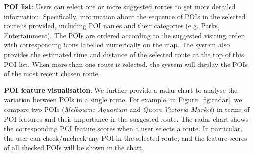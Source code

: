 
\textbf{POI list}:
Users can select one or more suggested routes to get more detailed information. 
Specifically, information about the sequence of POIs in the selected route is provided, including POI names and their categories (e.g. Parks, Entertainment).
The POIs are ordered according to the suggested visiting order, with corresponding icons labelled numerically on the map.
The system also provides the estimated time and distance of the selected route at the top of this POI list.
When more than one route is selected, the system will display the POIs of the most recent chosen route.

\textbf{POI feature visualisation}: We further provide a radar chart to analyse the variation between POIs in a single route. 
For example, in Figure~\ref{fig:radar}, we compare two POIs (\textit{Melbourne Aquarium} and \textit{Queen Victoria Market}) in terms of POI features and their importance in the suggested route. 
The radar chart shows the corresponding POI feature scores when a user selects a route.
In particular, the user can check/uncheck any POI in the selected route, and the feature scores of all checked POIs will be shown in the chart.

